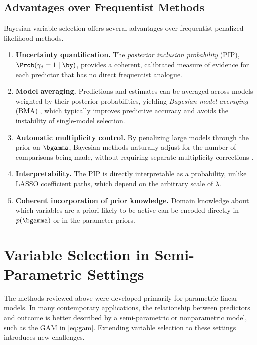 \subsection{Advantages over Frequentist Methods}
\label{subsec:bayes-advantages}

Bayesian variable selection offers several advantages over frequentist
penalized-likelihood methods.

\begin{enumerate}
  \item \textbf{Uncertainty quantification.} The \emph{posterior inclusion
  probability} (PIP), $\Prob(\gamma_j = 1 \mid \by)$, provides a
  coherent, calibrated measure of evidence for each predictor that has no
  direct frequentist analogue.

  \item \textbf{Model averaging.} Predictions and estimates can be averaged
  across models weighted by their posterior probabilities, yielding
  \emph{Bayesian model averaging} (BMA) \citep{hoeting1999bma}, which
  typically improves predictive accuracy and avoids the instability of
  single-model selection.

  \item \textbf{Automatic multiplicity control.} By penalizing large models
  through the prior on $\bgamma$, Bayesian methods naturally adjust for the
  number of comparisons being made, without requiring separate multiplicity
  corrections \citep{scott2010bayes}.

  \item \textbf{Interpretability.} The PIP is directly interpretable as a
  probability, unlike LASSO coefficient paths, which depend on the
  arbitrary scale of $\lambda$.

  \item \textbf{Coherent incorporation of prior knowledge.} Domain
  knowledge about which variables are a priori likely to be active can be
  encoded directly in $p(\bgamma)$ or in the parameter priors.
\end{enumerate}

\section{Variable Selection in Semi-Parametric Settings}
\label{sec:intro-semipar}

The methods reviewed above were developed primarily for parametric linear
models. In many contemporary applications, the relationship between
predictors and outcome is better described by a semi-parametric or
nonparametric model, such as the GAM in \eqref{eq:gam}. Extending variable
selection to these settings introduces new challenges.

